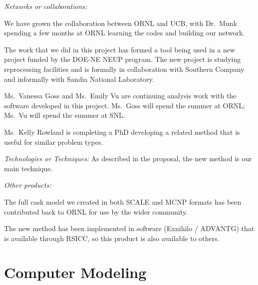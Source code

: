 \documentclass[12pt]{article}
\begin{document}
\textit{Networks or collaborations:} 
\begin{compactitem}
\item We have grown the collaboration between ORNL and UCB, with Dr.\ Munk spending a few months at ORNL learning the codes and building our network. 

\item The work that we did in this project has formed a tool being used in a new project funded by the DOE-NE NEUP program.  The new project is studying reprocessing facilities and is formally in collaboration with Southern Company and informally with Sandia National Laboratory. 

\item Ms.\ Vanessa Goss and Ms.\ Emily Vu are continuing analysis work with the software developed in this project. Ms.\ Goss will spend the summer at ORNL; Ms.\ Vu will spend the summer at SNL.

\item Ms.\ Kelly Rowland is completing a PhD developing a related method that is useful for similar problem types. 
\end{compactitem}

\textit{Technologies or Techniques:} As described in the proposal, the new method is our main technique. 

\textit{Other products:} 
\begin{compactitem}
\item The full cask model we created in both SCALE and MCNP formats has been contributed back to ORNL for use by the wider community.

\item The new method has been implemented in software (Exnihilo / ADVANTG) that is available through RSICC, so this product is also available to others. 
\end{compactitem}


\section{Computer Modeling}
\label{sect::modeling}
\end{document}
